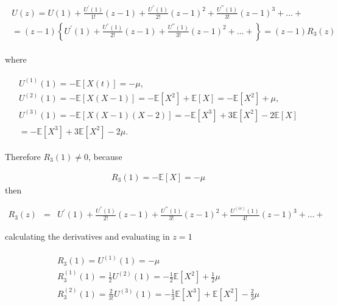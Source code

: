 \documentclass{article}
\newcommand{\esp}{\mathbb{E}}
\begin{document}
\begin{eqnarray*}
\begin{array}{l}
U\left(z\right)=U\left(1\right)+\frac{U^{'}\left(1\right)}{1!}\left(z-1\right)+\frac{U^{''}\left(1\right)}{2!}\left(z-1\right)^{2}+\frac{U^{'''}\left(1\right)}{3!}\left(z-1\right)^{3}+\ldots+\\
=\left(z-1\right)\left\{U^{'}\left(1\right)+\frac{U^{''}\left(1\right)}{2!}\left(z-1\right)+\frac{U^{'''}\left(1\right)}{3!}\left(z-1\right)^{2}+\ldots+\right\}
=\left(z-1\right)R_{3}\left(z\right)
\end{array}
\end{eqnarray*}

where

\begin{eqnarray*}
\begin{array}{l}
U^{(1)}\left(1\right)=-\esp\left[X\left(t\right)\right]=-\mu,\\ U^{(2)}\left(1\right)=-\esp\left[X\left(X-1\right)\right]
=-\esp\left[X^{2}\right]+\esp\left[X\right]=-\esp\left[X^{2}\right]+\mu,\\
U^{(3)}\left(1\right)=-\esp\left[X\left(X-1\right)\left(X-2\right)\right]
=-\esp\left[X^{3}\right]+3\esp\left[X^{2}\right]-2\esp\left[X\right]\\
=-\esp\left[X^{3}\right]+3\esp\left[X^{2}\right]-2\mu.
\end{array}
\end{eqnarray*}

Therefore $R_{3}\left(1\right)\neq0$, because

\begin{eqnarray}\label{Eq.R3}
R_{3}\left(1\right)=-\esp\left[X\right]=-\mu
\end{eqnarray}
then

\begin{eqnarray}
R_{3}\left(z\right)&=&U^{'}\left(1\right)+\frac{U^{''}\left(1\right)}{2!}\left(z-1\right)+\frac{U^{'''}\left(1\right)}{3!}\left(z-1\right)^{2}+\frac{U^{(iv)}\left(1\right)}{4!}\left(z-1\right)^{3}+\ldots+
\end{eqnarray}

calculating the derivatives and evaluating in $z=1$

\begin{eqnarray}
\begin{array}{l}
R_{3}\left(1\right)=U^{(1)}\left(1\right)=-\mu\\
R_{3}^{(1)}\left(1\right)=\frac{1}{2}U^{(2)}\left(1\right)=-\frac{1}{2}\esp\left[X^{2}\right]+\frac{1}{2}\mu\\
R_{3}^{(2)}\left(1\right)=\frac{2}{3!}U^{(3)}\left(1\right)
=-\frac{1}{3}\esp\left[X^{3}\right]+\esp\left[X^{2}\right]-\frac{2}{3}\mu
\end{array}
\end{eqnarray}
\end{document}
